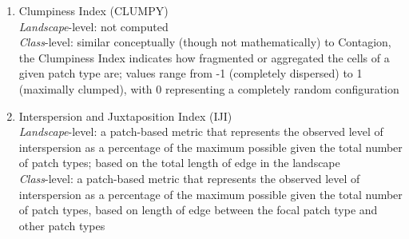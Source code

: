 \begin{itemize}
\begin{enumerate}
		\item Clumpiness Index (CLUMPY)\\
		\emph{Landscape}-level: not computed  	\\
		\emph{Class}-level: similar conceptually (though not mathematically) to Contagion, the Clumpiness Index indicates how fragmented or aggregated the cells of a given patch type are; values range from -1 (completely dispersed) to 1 (maximally clumped), with 0 representing a completely random configuration 	\\
		
		\item Interspersion and Juxtaposition Index (IJI) \\
		\emph{Landscape}-level: a patch-based metric that represents the observed level of interspersion as a percentage of the maximum possible given the total number of patch types; based on the total length of edge in the landscape 	\\
		\emph{Class}-level: a patch-based metric that represents the observed level of interspersion as a percentage of the maximum possible given the total number of patch types, based on length of edge between the focal patch type and other patch types 	\\
		

\end{enumerate}
\end{itemize}
